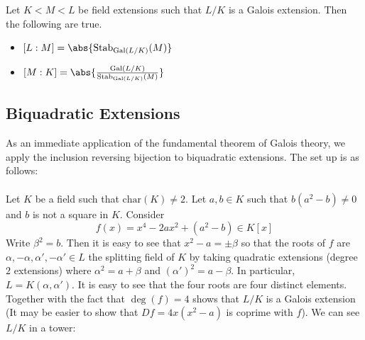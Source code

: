 \documentclass[a4paper]{article}
\begin{document}
\begin{prp}{}{} Let $K<M<L$ be field extensions such that $L/K$ is a Galois extension. Then the following are true. 
\begin{itemize}
\item $[L:M]=\abs{\text{Stab}_{\text{Gal}(L/K)}(M)}$
\item $[M:K]=\abs{\frac{\text{Gal}(L/K)}{\text{Stab}_{\text{Gal}(L/K)}(M)}}$
\end{itemize}
\end{prp}

\subsection{Biquadratic Extensions}
As an immediate application of the fundamental theorem of Galois theory, we apply the inclusion reversing bijection to biquadratic extensions. The set up is as follows: \\~\\

Let $K$ be a field such that $\text{char}(K)\neq 2$. Let $a,b\in K$ such that $b(a^2-b)\neq 0$ and $b$ is not a square in $K$. Consider $$f(x)=x^4-2ax^2+(a^2-b)\in K[x]$$ Write $\beta^2=b$. Then it is easy to see that $x^2-a=\pm\beta$ so that the roots of $f$ are $\alpha,-\alpha,\alpha',-\alpha'\in L$ the splitting field of $K$ by taking quadratic extensions (degree $2$ extensions) where $\alpha^2=a+\beta$ and $(\alpha')^2=a-\beta$. In particular, $L=K(\alpha,\alpha')$. It is easy to see that the four roots are four distinct elements. Together with the fact that $\deg(f)=4$ shows that $L/K$ is a Galois extension (It may be easier to show that $Df=4x(x^2-a)$ is coprime with $f$). We can see $L/K$ in a tower: \\~\\
\\~\\
\end{document}
